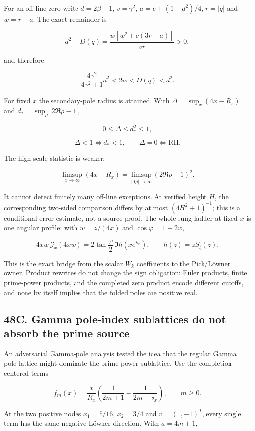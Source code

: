 \documentclass[
  11pt,
]{book}
\begin{document}
For an off-line zero write \(d=2\beta-1\), \(v=\gamma^2\),
\(a=v+(1-d^2)/4\), \(r=|q|\) and \(w=r-a\). The exact remainder is

\[
\boxed{d^2-D(q)=\frac{w[w^2+c(3r-a)]}{vr}>0,}
\tag{48.29}
\]

and therefore

\[
\boxed{\frac{4\gamma^2}{4\gamma^2+1}d^2<2w<D(q)<d^2.}
\tag{48.30}
\]

For fixed \(x\) the secondary-pole radius is attained. With
\(\Delta=\sup_x(4x-R_x)\) and \(d_*=\sup_\rho|2\Re\rho-1|\),

\[
0\le\Delta\le d_*^2\le1,
\tag{48.31}
\]

\[
\boxed{\Delta<1\iff d_*<1,\qquad \Delta=0\iff\mathrm{RH}.}
\tag{48.32}
\]

The high-scale statistic is weaker:

\[
\boxed{\limsup_{x\to\infty}(4x-R_x)
=\limsup_{|\Im\rho|\to\infty}(2\Re\rho-1)^2.}
\tag{48.33}
\]

It cannot detect finitely many off-line exceptions. At verified height
\(H\), the corresponding two-sided comparison differs by at most
\((4H^2+1)^{-1}\); this is a conditional error estimate, not a source
proof. The whole rung ladder at fixed \(x\) is one angular profile: with
\(w=z/(4x)\) and \(\cos\varphi=1-2w\),

\[
4xw\,\mathcal G_x(4xw)
=2\tan\frac\varphi2\,\Im h(xe^{i\varphi}),
\qquad h(z)=zS_\xi(z).
\tag{48.28}
\]

This is the exact bridge from the scalar \(W_k\) coefficients to the
Pick/Löwner owner. Product rewrites do not change the sign obligation:
Euler products, finite prime-power products, and the completed zero
product encode different cutoffs, and none by itself implies that the
folded poles are positive real.

\subsection{48C. Gamma pole-index sublattices do not absorb the prime
source}\label{c.-gamma-pole-index-sublattices-do-not-absorb-the-prime-source}

An adversarial Gamma-pole analysis tested the idea that the regular
Gamma pole lattice might dominate the prime-power sublattice. Use the
completion-centered terms

\[
f_m(x)=\frac{x}{R_x}\left(\frac1{2m+1}-\frac1{2m+s_x}\right),
\qquad m\ge0.
\tag{48.40}
\]

At the two positive nodes \(x_1=5/16\), \(x_2=3/4\) and \(v=(1,-1)^T\),
every single term has the same negative Löwner direction. With
\(a=4m+1\),
\end{document}

